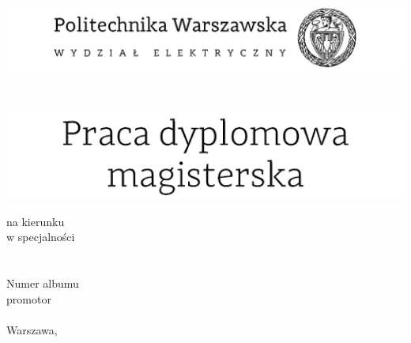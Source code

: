\begin{titlepage}
\begingroup
\begin{center}		
			\includegraphics[width=1.0\textwidth]{img/pw_header}
			
			\vspace{1.3cm}
			\fontsize{12}{14}\selectfont\myDepartmentFirst \\ \myDepartmentSecond \bigskip
			
			\vspace{1.0cm}
			\includegraphics[width=1.0\textwidth]{img/pw_title}
			
			na kierunku \myCourse \\
			w specjalności \mySpecialization \\
			\vspace{1cm}
			{\fontsize{14}{18}\selectfont \myTitle} \\ 
			
			\vspace{1.5cm}
			\fontsize{21}{25}\selectfont \myName \\
			\fontsize{12}{14}\selectfont
			Numer albumu \myNumber \\
			\vspace{1.5cm}
			promotor \\
			\myProf \\
			\vfill 
			Warszawa, \myYear
        \vfill                      
\end{center}
\endgroup
\end{titlepage}